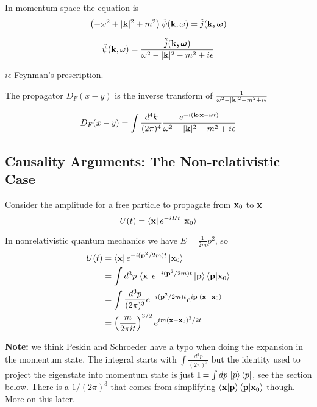In momentum space the equation is
$$
\left( -\omega^2 + |\boldsymbol{\mathbf{k}}|^2 + m^2 \right) \tilde{\psi}(\boldsymbol{\mathbf{k}}, \omega) = \tilde{j}(\boldsymbol{\mathbf{\boldsymbol{\mathbf{k}}, \omega}})
$$

$$
\tilde{\psi}(\boldsymbol{\mathbf{k}}, \omega) = \frac{ \tilde{j}(\boldsymbol{\mathbf{\boldsymbol{\mathbf{k}}, \omega}}) }{ \omega^2 - |\boldsymbol{\mathbf{k}}|^2 - m^2 + i\epsilon }
$$

$i\epsilon$ Feynman's prescription.

The propagator $D_F(x-y)$ is the inverse transform of
$\frac{ 1 }{ \omega^2 - |\boldsymbol{\mathbf{k}}|^2 - m^2 + i\epsilon }$

$$
D_F(x-y) = \int \frac{d^4k}{(2\pi)^4}
    \frac{ e^{-i(\boldsymbol{\mathbf{k}}\cdot\boldsymbol{\mathbf{x}} -\omega t)} }{ \omega^2 - |\boldsymbol{\mathbf{k}}|^2 - m^2 + i\epsilon }
$$






\subsection{Causality Arguments: The Non-relativistic Case}

Consider the amplitude for a free particle to propagate from $\boldsymbol{\mathbf{x}}_0$ to $\boldsymbol{\mathbf{x}}$
$$
U(t) = \bra{\boldsymbol{\mathbf{x}}} e^{-iHt} \ket{\boldsymbol{\mathbf{x}}_0}
$$

In nonrelativistic quantum mechanics we have $E = \frac{1}{2m} p^2$, so
\begin{align}
U(t) &= \bra{\boldsymbol{\mathbf{x}}} e^{-i(\boldsymbol{\mathbf{p}}^2/2m)t} \ket{\boldsymbol{\mathbf{x}}_0} \label{kg:nonrelativistic-01} \\
&= \int d^3p \, \bra{\boldsymbol{\mathbf{x}}} e^{-i(\boldsymbol{\mathbf{p}}^2/2m)t} \ket{\boldsymbol{\mathbf{p}}} \braket{\boldsymbol{\mathbf{p}} | \boldsymbol{\mathbf{x}}_0} \label{kg:nonrelativistic-02} \\
&= \int \frac{d^3p}{(2\pi)^3} e^{-i(\boldsymbol{\mathbf{p}}^2/2m)t} e^{i\boldsymbol{\mathbf{p}}\cdot(\boldsymbol{\mathbf{x}}-\boldsymbol{\mathbf{x}}_0)} \label{kg:nonrelativistic-03} \\
&= \left( \frac{m}{2\pi i t} \right)^{3/2} e^{im (\boldsymbol{\mathbf{x}}-\boldsymbol{\mathbf{x}}_0)^2 /2t} \label{kg:nonrelativistic-04}
\end{align}

\textbf{Note:} we think Peskin and Schroeder have a typo when doing the expansion in the momentum state.
The integral starts with $\int \frac{d^3p}{(2\pi)^3}$ but the identity used to project the eigenstate into momentum
state is just $\mathbb{I} = \int dp\, \ket{p}\bra{p}$, see the section below.
There is a $1/(2\pi)^3$ that comes from simplifying $\braket{\boldsymbol{\mathbf{x}} | \boldsymbol{\mathbf{p}}} \braket{\boldsymbol{\mathbf{p}} | \boldsymbol{\mathbf{x}}_0}$ though.
More on this later.
\\



